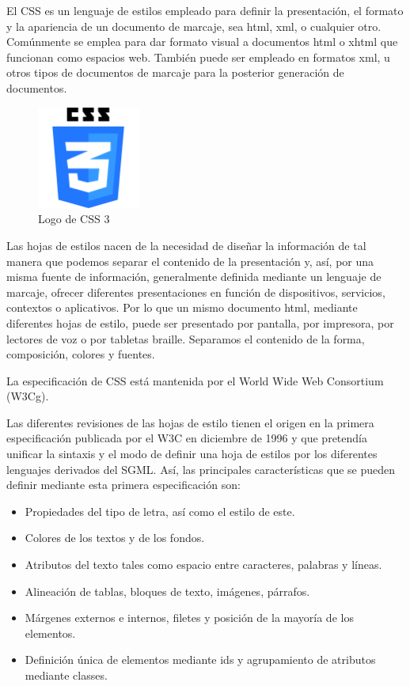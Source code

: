 El CSS es un lenguaje de estilos empleado para definir la presentación, el formato y la apariencia de un documento de marcaje, sea html, xml, o cualquier otro. Comúnmente se emplea para dar formato visual a documentos html o xhtml que funcionan como espacios web. También puede ser empleado en formatos xml, u otros tipos de documentos de marcaje para la posterior generación de documentos.

\begin{figure}[htb]
    \centering
    \includegraphics[width=0.3\textwidth]{imagenes/css3logo.png}
    \caption{Logo de CSS 3}
    \label{fig:logocss}
\end{figure}

Las hojas de estilos nacen de la necesidad de diseñar la información de tal manera que podemos separar el contenido de la presentación y, así, por una misma fuente de información, generalmente definida mediante un lenguaje de marcaje, ofrecer diferentes presentaciones en función de dispositivos, servicios, contextos o aplicativos. Por lo que un mismo documento html, mediante diferentes hojas de estilo, puede ser presentado por pantalla, por impresora, por lectores de voz o por tabletas braille. Separamos el contenido de la forma, composición, colores y fuentes.

La especificación de CSS está mantenida por el World Wide Web Consortium (W3Cg).


Las diferentes revisiones de las hojas de estilo tienen el origen en la primera especificación publicada por el W3C en diciembre de 1996 y que pretendía unificar la sintaxis y el modo de definir una hoja de estilos por los diferentes lenguajes derivados del SGML. Así, las principales características que se pueden definir mediante esta primera especificación son:
\begin{itemize}
    \item Propiedades del tipo de letra, así como el estilo de este.
    \item Colores de los textos y de los fondos.
    \item Atributos del texto tales como espacio entre caracteres, palabras y líneas.
    \item Alineación de tablas, bloques de texto, imágenes, párrafos.
    \item Márgenes externos e internos, filetes y posición de la mayoría de los elementos.
    \item Definición única de elementos mediante ids y agrupamiento de atributos
    mediante classes.
\end{itemize}

